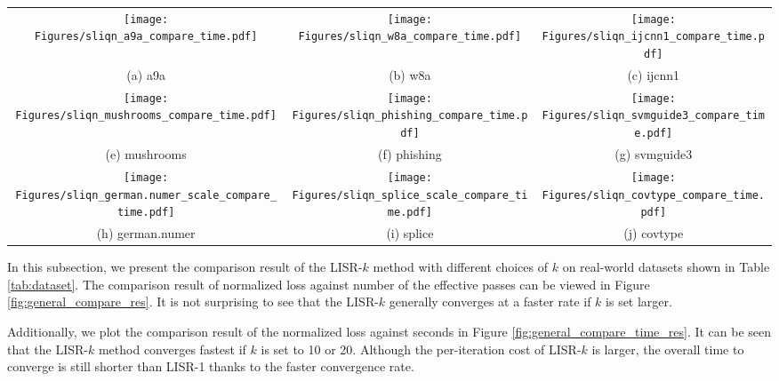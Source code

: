 \documentclass[letterpaper]{article} %
\theoremstyle{plain}
\theoremstyle{definition}
\theoremstyle{remark}
\begin{document}
\begin{figure*}[!tb]
\centering
\begin{tabular}{ccc}
     \texttt{[image: Figures/sliqn\_a9a\_compare\_time.pdf]}
     & \texttt{[image: Figures/sliqn\_w8a\_compare\_time.pdf]}
     & \texttt{[image: Figures/sliqn\_ijcnn1\_compare\_time.pdf]} \\
     (a) a9a & (b) w8a &  (c) ijcnn1 \\
     \texttt{[image: Figures/sliqn\_mushrooms\_compare\_time.pdf]}
     & \texttt{[image: Figures/sliqn\_phishing\_compare\_time.pdf]}
     & \texttt{[image: Figures/sliqn\_svmguide3\_compare\_time.pdf]} \\   
     (e) mushrooms & (f) phishing &  (g) svmguide3 \\
     \texttt{[image: Figures/sliqn\_german.numer\_scale\_compare\_time.pdf]}
     & \texttt{[image: Figures/sliqn\_splice\_scale\_compare\_time.pdf]}
     & \texttt{[image: Figures/sliqn\_covtype\_compare\_time.pdf]}    \\
     (h) german.numer & (i) splice &  (j) covtype \\
\end{tabular}
\caption{Comparison of the LISR-$k$ method with different choices of $k$ for the general function minimization. }
\label{fig:general_compare_time_res}
\end{figure*}
In this subsection, we present the comparison result of the LISR-$k$ method with different choices of $k$ on real-world datasets shown in Table \ref{tab:dataset}.
The comparison result of normalized loss against number of the effective passes can be viewed in Figure \ref{fig:general_compare_res}.
It is not surprising to see that the LISR-$k$ generally converges at a faster rate if $k$ is set larger.
 
Additionally, we plot the comparison result of the normalized loss against seconds in Figure \ref{fig:general_compare_time_res}.
It can be seen that the LISR-$k$ method converges fastest if $k$ is set to 10 or 20. 
Although the per-iteration cost of LISR-$k$ is larger, the overall time to converge is still shorter than LISR-1 thanks to the faster convergence rate.
\end{document}
